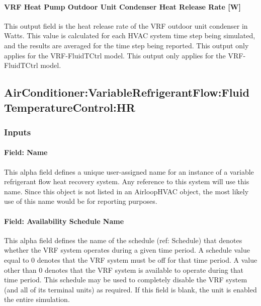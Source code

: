 \paragraph{VRF Heat Pump Outdoor Unit Condenser Heat Release Rate {[}W{]}}\label{vrf-heat-pump-outdoor-unit-condenser-heat-release-rate}

This output field is the heat release rate of the VRF outdoor unit condenser in Watts. This value is calculated for each HVAC system time step being simulated, and the results are averaged for the time step being reported. This output only applies for the VRF-FluidTCtrl model. This output only applies for the VRF-FluidTCtrl model.



\subsection{AirConditioner:VariableRefrigerantFlow:FluidTemperatureControl:HR}\label{airconditionervariablerefrigerantflowfluidtemperaturecontrolhr}
\subsubsection{Inputs}
\paragraph{Field: Name}

This alpha field defines a unique user-assigned name for an instance of a variable refrigerant flow heat recovery system. Any reference to this system will use this name. Since this object is not listed in an AirloopHVAC object, the most likely use of this name would be for reporting purposes.

\paragraph{Field: Availability Schedule Name}

This alpha field defines the name of the schedule (ref: Schedule) that denotes whether the VRF system operates during a given time period. A schedule value equal to 0 denotes that the VRF system must be off for that time period. A value other than 0 denotes that the VRF system is available to operate during that time period. This schedule may be used to completely disable the VRF system (and all of its terminal units) as required. If this field is blank, the unit is enabled the entire simulation.


